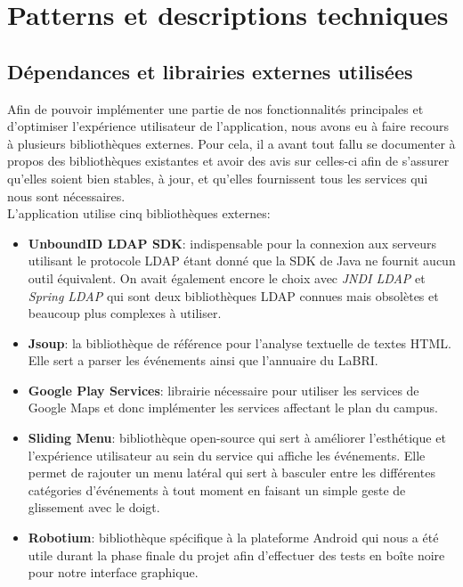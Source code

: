 \chapter{Patterns et descriptions techniques}

\section{Dépendances et librairies externes utilisées}

Afin de pouvoir implémenter une partie de nos fonctionnalités principales et d'optimiser l'expérience utilisateur de l'application, nous avons eu à faire recours à plusieurs bibliothèques externes. Pour cela, il a avant tout fallu se documenter à propos des bibliothèques existantes et avoir des avis sur celles-ci afin de s'assurer qu'elles soient bien stables, à jour, et qu'elles fournissent tous les services qui nous sont nécessaires.\\

L'application utilise cinq bibliothèques externes: \\

\begin{itemize}
\renewcommand{\labelitemi}{$\bullet$}
\item \textbf{UnboundID LDAP SDK}: indispensable pour la connexion aux serveurs utilisant le protocole LDAP étant donné que la SDK de Java ne fournit aucun outil équivalent. On avait également encore le choix avec \textit{JNDI LDAP} et \textit{Spring LDAP} qui sont deux bibliothèques LDAP connues mais obsolètes et beaucoup plus complexes à utiliser. \\
\item \textbf{Jsoup}: la bibliothèque de référence pour l'analyse textuelle de textes HTML. Elle sert a parser les événements ainsi que l'annuaire du LaBRI. \\
\item \textbf{Google Play Services}: librairie nécessaire pour utiliser les services de Google Maps et donc implémenter les services affectant le plan du campus. \\
\item \textbf{Sliding Menu}: bibliothèque open-source qui sert à améliorer l'esthétique et l'expérience utilisateur au sein du service qui affiche les événements. Elle permet de rajouter un menu latéral qui sert à basculer entre les différentes catégories d'événements à tout moment en faisant un simple geste de glissement avec le doigt. \\
\item \textbf{Robotium}: bibliothèque spécifique à la plateforme Android qui nous a été utile durant la phase finale du projet afin d'effectuer des tests en boîte noire pour notre interface graphique. 
\end{itemize}

